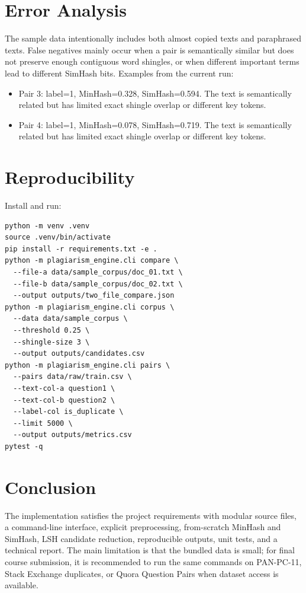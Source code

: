 \documentclass[11pt,a4paper]{article}
\begin{document}
\section{Error Analysis}
The sample data intentionally includes both almost copied texts and paraphrased texts. False negatives mainly occur when a pair is semantically similar but does not preserve enough contiguous word shingles, or when different important terms lead to different SimHash bits. Examples from the current run:
\begin{itemize}

  \item Pair 3: label=1, MinHash=0.328, SimHash=0.594. The text is semantically related but has limited exact shingle overlap or different key tokens.
  \item Pair 4: label=1, MinHash=0.078, SimHash=0.719. The text is semantically related but has limited exact shingle overlap or different key tokens.
\end{itemize}

\section{Reproducibility}
Install and run:
\begin{verbatim}
python -m venv .venv
source .venv/bin/activate
pip install -r requirements.txt -e .
python -m plagiarism_engine.cli compare \
  --file-a data/sample_corpus/doc_01.txt \
  --file-b data/sample_corpus/doc_02.txt \
  --output outputs/two_file_compare.json
python -m plagiarism_engine.cli corpus \
  --data data/sample_corpus \
  --threshold 0.25 \
  --shingle-size 3 \
  --output outputs/candidates.csv
python -m plagiarism_engine.cli pairs \
  --pairs data/raw/train.csv \
  --text-col-a question1 \
  --text-col-b question2 \
  --label-col is_duplicate \
  --limit 5000 \
  --output outputs/metrics.csv
pytest -q
\end{verbatim}

\section{Conclusion}
The implementation satisfies the project requirements with modular source files, a command-line interface, explicit preprocessing, from-scratch MinHash and SimHash, LSH candidate reduction, reproducible outputs, unit tests, and a technical report. The main limitation is that the bundled data is small; for final course submission, it is recommended to run the same commands on PAN-PC-11, Stack Exchange duplicates, or Quora Question Pairs when dataset access is available.
\end{document}
